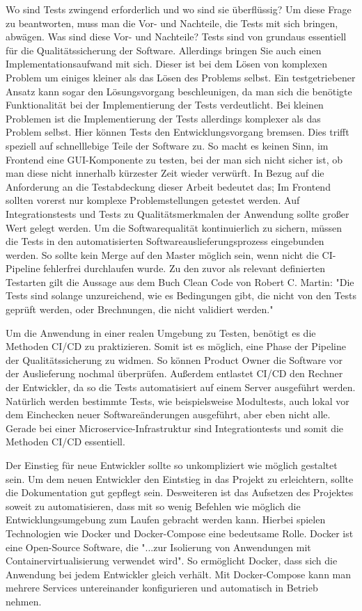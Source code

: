 Wo sind Tests zwingend erforderlich und wo sind sie überflüssig? Um diese Frage zu beantworten, muss
man die Vor- und Nachteile, die Tests mit sich bringen, abwägen. Was sind diese Vor- und Nachteile?
Tests sind von grundaus essentiell für die Qualitätssicherung der Software. Allerdings bringen Sie auch
einen Implementationsaufwand mit sich. Dieser ist bei dem Lösen von komplexen Problem um einiges kleiner
als das Lösen des Problems selbst. Ein testgetriebener Ansatz kann sogar den Lösungsvorgang beschleunigen,
da man sich die benötigte Funktionalität bei der Implementierung der Tests verdeutlicht.
Bei kleinen Problemen ist die Implementierung der Tests allerdings komplexer als das Problem selbst.
Hier können Tests den Entwicklungsvorgang bremsen. Dies trifft speziell auf schnelllebige Teile der 
Software zu. So macht es keinen Sinn, im Frontend eine GUI-Komponente zu testen, bei der man sich nicht sicher ist,
ob man diese nicht innerhalb kürzester Zeit wieder verwürft. In Bezug auf die Anforderung an die Testabdeckung dieser Arbeit bedeutet das;
Im Frontend sollten vorerst nur komplexe Problemstellungen getestet werden. Auf Integrationstests und Tests
zu Qualitätsmerkmalen der Anwendung sollte großer Wert gelegt werden. Um die Softwarequalität kontinuierlich
zu sichern, müssen die Tests in den automatisierten Softwareauslieferungsprozess eingebunden werden. 
So sollte kein Merge auf den Master möglich sein, wenn nicht die CI-Pipeline fehlerfrei durchlaufen wurde.
Zu den zuvor als relevant definierten Testarten gilt die Aussage aus dem Buch Clean Code von Robert C. Martin:
"Die Tests sind solange unzureichend, wie es Bedingungen gibt, die nicht von den Tests geprüft werden,
oder Brechnungen, die nicht validiert werden." \cite[S. 370]{CleanCode}

Um die Anwendung in einer realen Umgebung zu Testen, benötigt es die Methoden CI/CD
zu praktizieren. Somit ist es möglich, eine Phase der Pipeline der Qualitätssicherung zu widmen.
So können Product Owner die Software vor der Auslieferung nochmal überprüfen. Außerdem
entlastet CI/CD den Rechner der Entwickler, da so die Tests automatisiert auf einem Server
ausgeführt werden. Natürlich werden bestimmte Tests, wie beispielsweise Modultests, auch 
lokal vor dem Einchecken neuer Softwareänderungen ausgeführt, aber eben nicht alle. Gerade
bei einer Microservice-Infrastruktur sind Integrationtests und somit die Methoden CI/CD essentiell.

Der Einstieg für neue Entwickler sollte so unkompliziert wie möglich gestaltet sein. Um dem neuen
Entwickler den Eintstieg in das Projekt zu erleichtern, sollte die Dokumentation gut gepflegt sein.
Desweiteren ist das Aufsetzen des Projektes soweit zu automatisieren, dass mit so wenig Befehlen
wie möglich die Entwicklungsumgebung zum Laufen gebracht werden kann. Hierbei spielen Technologien
wie Docker und Docker-Compose eine bedeutsame Rolle. Docker ist eine Open-Source Software,
die "...zur Isolierung von Anwendungen mit Containervirtualisierung verwendet wird". \cite{WikiDockerSoftware}
So ermöglicht Docker, dass sich die Anwendung bei jedem Entwickler gleich verhält. Mit Docker-Compose
kann man mehrere Services untereinander konfigurieren und automatisch in Betrieb nehmen.

